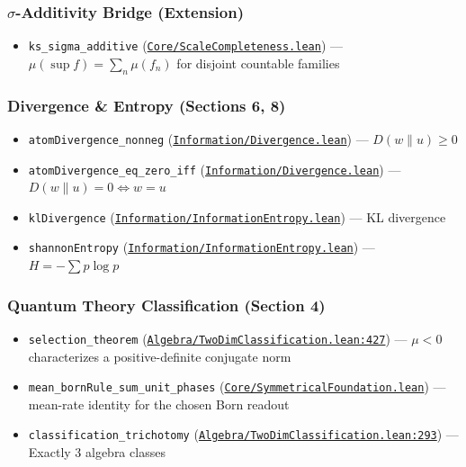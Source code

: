 \documentclass[11pt]{article}
\theoremstyle{definition}
\theoremstyle{remark}
\begin{document}
\subsubsection*{$\sigma$-Additivity Bridge (Extension)}
\begin{itemize}
\item \texttt{ks\_sigma\_additive} (\href{https://github.com/zariuq/ks-foundations-of-inference/blob/main/KnuthSkilling/Core/ScaleCompleteness.lean}{\texttt{Core/ScaleCompleteness.lean}}) --- $\mu(\sup f)=\sum_n \mu(f_n)$ for disjoint countable families
\end{itemize}

\subsubsection*{Divergence \& Entropy (Sections 6, 8)}
\begin{itemize}
\item \texttt{atomDivergence\_nonneg} (\href{https://github.com/zariuq/ks-foundations-of-inference/blob/main/KnuthSkilling/Information/Divergence.lean}{\texttt{Information/Divergence.lean}}) --- $D(w \| u) \geq 0$
\item \texttt{atomDivergence\_eq\_zero\_iff} (\href{https://github.com/zariuq/ks-foundations-of-inference/blob/main/KnuthSkilling/Information/Divergence.lean}{\texttt{Information/Divergence.lean}}) --- $D(w \| u) = 0 \Leftrightarrow w = u$
\item \texttt{klDivergence} (\href{https://github.com/zariuq/ks-foundations-of-inference/blob/main/KnuthSkilling/Information/InformationEntropy.lean}{\texttt{Information/InformationEntropy.lean}}) --- KL divergence
\item \texttt{shannonEntropy} (\href{https://github.com/zariuq/ks-foundations-of-inference/blob/main/KnuthSkilling/Information/InformationEntropy.lean}{\texttt{Information/InformationEntropy.lean}}) --- $H = -\sum p \log p$
\end{itemize}

\subsubsection*{Quantum Theory Classification (Section 4)}
\begin{itemize}
\item \texttt{selection\_theorem} (\href{https://github.com/zariuq/ks-foundations-of-inference/blob/main/Algebra/TwoDimClassification.lean\#L427}{\texttt{Algebra/TwoDimClassification.lean:427}}) --- $\mu < 0$ characterizes a positive-definite conjugate norm
\item \texttt{mean\_bornRule\_sum\_unit\_phases} (\href{https://github.com/zariuq/ks-foundations-of-inference/blob/main/KnuthSkilling/Core/SymmetricalFoundation.lean}{\texttt{Core/SymmetricalFoundation.lean}}) --- mean-rate identity for the chosen Born readout
\item \texttt{classification\_trichotomy} (\href{https://github.com/zariuq/ks-foundations-of-inference/blob/main/Algebra/TwoDimClassification.lean\#L293}{\texttt{Algebra/TwoDimClassification.lean:293}}) --- Exactly 3 algebra classes
\end{itemize}
\end{document}
